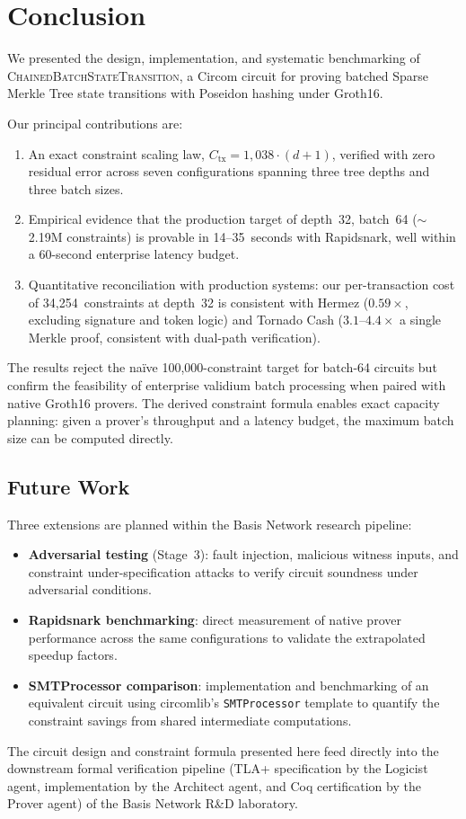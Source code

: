 \section{Conclusion}

We presented the design, implementation, and systematic benchmarking of
\textsc{ChainedBatchStateTransition}, a Circom circuit for proving
batched Sparse Merkle Tree state transitions with Poseidon hashing
under Groth16.

Our principal contributions are:

\begin{enumerate}
\item An exact constraint scaling law, $C_{\text{tx}} = 1{,}038 \cdot (d+1)$,
  verified with zero residual error across seven configurations spanning
  three tree depths and three batch sizes.

\item Empirical evidence that the production target of depth~32,
  batch~64 ($\sim$2.19M constraints) is provable in 14--35~seconds
  with Rapidsnark, well within a 60-second enterprise latency budget.

\item Quantitative reconciliation with production systems: our
  per-transaction cost of 34,254~constraints at depth~32 is consistent
  with Hermez ($0.59\times$, excluding signature and token logic) and
  Tornado Cash ($3.1\text{--}4.4\times$ a single Merkle proof, consistent
  with dual-path verification).
\end{enumerate}

The results reject the na\"ive 100,000-constraint target for batch-64
circuits but confirm the feasibility of enterprise validium batch
processing when paired with native Groth16 provers. The derived
constraint formula enables exact capacity planning: given a prover's
throughput and a latency budget, the maximum batch size can be computed
directly.

\subsection{Future Work}

Three extensions are planned within the Basis Network research pipeline:

\begin{itemize}
\item \textbf{Adversarial testing} (Stage~3): fault injection,
  malicious witness inputs, and constraint under-specification attacks
  to verify circuit soundness under adversarial conditions.

\item \textbf{Rapidsnark benchmarking}: direct measurement of native
  prover performance across the same configurations to validate the
  extrapolated speedup factors.

\item \textbf{SMTProcessor comparison}: implementation and benchmarking
  of an equivalent circuit using circomlib's \texttt{SMTProcessor}
  template to quantify the constraint savings from shared intermediate
  computations.
\end{itemize}

The circuit design and constraint formula presented here feed directly
into the downstream formal verification pipeline (TLA+ specification
by the Logicist agent, implementation by the Architect agent, and
Coq certification by the Prover agent) of the Basis Network R\&D
laboratory.
